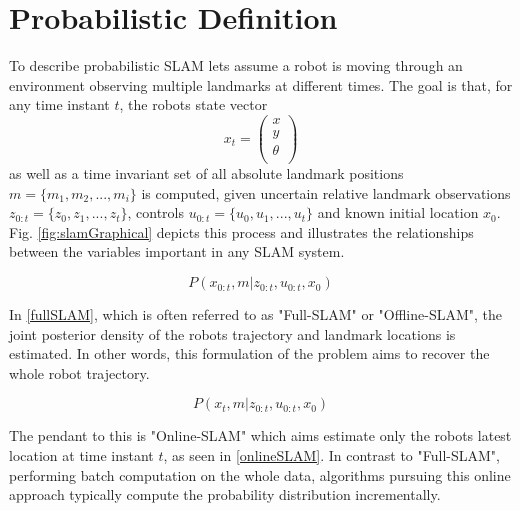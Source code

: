 \section{Probabilistic Definition}
To describe probabilistic SLAM lets assume a robot is moving through an environment observing multiple landmarks at different times. 
The goal is that, for any time instant $ t $, the robots state vector 
\[ x_{t} = 
\begin{pmatrix}
	x \\
	y \\
	\theta \\
\end{pmatrix}
\] as well as a time invariant set of all absolute landmark positions 
$ m = \{ m_{1}, m_{2}, ..., m_{i} \}$ 
is computed, given uncertain relative landmark observations $ z_{0:t} = \{z_{0}, z_{1}, ..., z_{t}\}$, controls $ u_{0:t} = \{u_{0}, u_{1}, ..., u_{t}\}$ and known initial location $ x_{0} $. Fig. \ref{fig:slamGraphical} depicts this process and illustrates the relationships between the variables important in any SLAM system. 

\begin{equation}\label{fullSLAM}
	P(x_{0:t}, m | z_{0:t}, u_{0:t}, x_{0})
\end{equation}

In \ref{fullSLAM}, which is often referred to as "Full-SLAM" or "Offline-SLAM", the joint posterior density of the robots trajectory and landmark locations is estimated. In other words, this formulation of the problem aims to recover the whole robot trajectory.

\begin{equation}\label{onlineSLAM}
	P(x_{t}, m | z_{0:t}, u_{0:t}, x_{0})
\end{equation}

The pendant to this is "Online-SLAM" which aims estimate only the robots latest location at time instant $ t $, as seen in \ref{onlineSLAM}. In contrast to "Full-SLAM", performing batch computation on the whole data, algorithms pursuing this online approach typically compute the probability distribution incrementally. 

